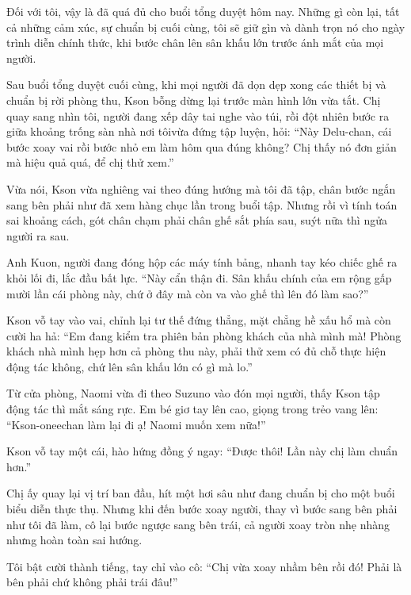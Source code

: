 ﻿\documentclass[../main.tex]{subfiles}
\begin{document}
Đối với tôi, vậy là đã quá đủ cho buổi tổng duyệt hôm nay. Những gì còn lại, tất cả những cảm xúc, sự chuẩn bị cuối cùng, tôi sẽ giữ gìn và dành trọn nó cho ngày trình diễn chính thức, khi bước chân lên sân khấu lớn trước ánh mắt của mọi người.


\omk

Sau buổi tổng duyệt cuối cùng, khi mọi người đã dọn dẹp xong các thiết bị và chuẩn bị rời phòng thu, Kson bỗng dừng lại trước màn hình lớn vừa tắt. Chị quay sang nhìn tôi, người đang xếp dây tai nghe vào túi, rồi đột nhiên bước ra giữa khoảng trống sàn nhà nơi tôivừa đứng tập luyện, hỏi: ``Này Delu-chan, cái bước xoay vai rồi bước nhỏ em làm hôm qua đúng không? Chị thấy nó đơn giản mà hiệu quả quá, để chị thử xem.''

Vừa nói, Kson vừa nghiêng vai theo đúng hướng mà tôi đã tập, chân bước ngắn sang bên phải như đã xem hàng chục lần trong buổi tập. Nhưng rồi vì tính toán sai khoảng cách, gót chân chạm phải chân ghế sắt phía sau, suýt nữa thì ngửa người ra sau.

Anh Kuon, người đang đóng hộp các máy tính bảng, nhanh tay kéo chiếc ghế ra khỏi lối đi, lắc đầu bất lực. ``Này cẩn thận đi. Sân khấu chính của em rộng gấp mười lần cái phòng này, chứ ở đây mà còn va vào ghế thì lên đó làm sao?''

Kson vỗ tay vào vai, chỉnh lại tư thế đứng thẳng, mặt chẳng hề xấu hổ mà còn cười ha hả: ``Em đang kiểm tra phiên bản phòng khách của nhà mình mà! Phòng khách nhà mình hẹp hơn cả phòng thu này, phải thử xem có đủ chỗ thực hiện động tác không, chứ lên sân khấu lớn có gì mà lo.''

Từ cửa phòng, Naomi vừa đi theo Suzuno vào đón mọi người, thấy Kson tập động tác thì mắt sáng rực. Em bé giơ tay lên cao, giọng trong trẻo vang lên: ``Kson-oneechan làm lại đi ạ! Naomi muốn xem nữa!''

Kson vỗ tay một cái, hào hứng đồng ý ngay: ``Được thôi! Lần này chị làm chuẩn hơn.''

Chị ấy quay lại vị trí ban đầu, hít một hơi sâu như đang chuẩn bị cho một buổi biểu diễn thực thụ. Nhưng khi đến bước xoay người, thay vì bước sang bên phải như tôi đã làm, cô lại bước ngược sang bên trái, cả người xoay tròn nhẹ nhàng nhưng hoàn toàn sai hướng.

Tôi bật cười thành tiếng, tay chỉ vào cô: ``Chị vừa xoay nhầm bên rồi đó! Phải là bên phải chứ không phải trái đâu!''
\end{document}
